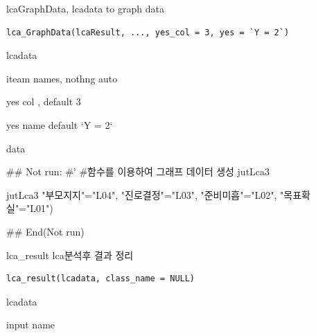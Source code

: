 \documentclass[a4paper]{book}
\begin{document}
%
\begin{Description}
lcaGraphData, lcadata to graph data
\end{Description}
%
\begin{Usage}
\begin{verbatim}
lca_GraphData(lcaResult, ..., yes_col = 3, yes = `Y = 2`)
\end{verbatim}
\end{Usage}
%
\begin{Arguments}
\begin{ldescription}
\item[\code{lcaResult}] lcadata

\item[\code{...}] iteam names, nothng auto

\item[\code{yes\_col}] yes col , default 3

\item[\code{yes}] yes name default `Y = 2`
\end{ldescription}
\end{Arguments}
%
\begin{Value}
data
\end{Value}
%
\begin{Examples}
\begin{ExampleCode}
## Not run: 
#'
#함수를 이용하여 그래프 데이터 생성
jutLca3 %

jutLca3 %
                         "부모지지"="L04",
                         "진로결정"="L03",
                         "준비미흡"="L02",
                         "목표확실"="L01")


## End(Not run)

\end{ExampleCode}
\end{Examples}
%
\begin{Description}
lca\_result lca분석후 결과 정리
\end{Description}
%
\begin{Usage}
\begin{verbatim}
lca_result(lcadata, class_name = NULL)
\end{verbatim}
\end{Usage}
%
\begin{Arguments}
\begin{ldescription}
\item[\code{lcadata}] lcadata

\item[\code{class\_name}] input name
\end{ldescription}
\end{Arguments}
\end{document}
